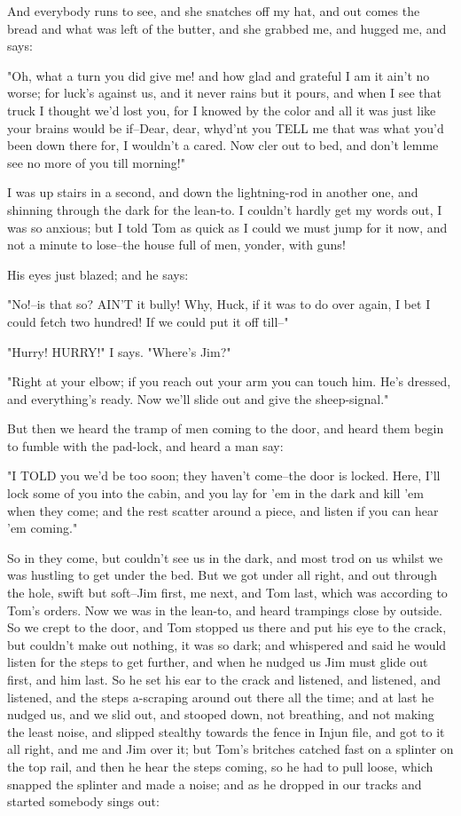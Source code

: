 And everybody runs to see, and she snatches off my hat, and out comes the
bread and what was left of the butter, and she grabbed me, and hugged me,
and says:

"Oh, what a turn you did give me! and how glad and grateful I am it ain't
no worse; for luck's against us, and it never rains but it pours, and
when I see that truck I thought we'd lost you, for I knowed by the color
and all it was just like your brains would be if--Dear, dear, whyd'nt you
TELL me that was what you'd been down there for, I wouldn't a cared.  Now
cler out to bed, and don't lemme see no more of you till morning!"

I was up stairs in a second, and down the lightning-rod in another one,
and shinning through the dark for the lean-to.  I couldn't hardly get my
words out, I was so anxious; but I told Tom as quick as I could we must
jump for it now, and not a minute to lose--the house full of men, yonder,
with guns!

His eyes just blazed; and he says:

"No!--is that so?  AIN'T it bully!  Why, Huck, if it was to do over
again, I bet I could fetch two hundred!  If we could put it off till--"

"Hurry!  HURRY!"  I says.  "Where's Jim?"

"Right at your elbow; if you reach out your arm you can touch him.  He's
dressed, and everything's ready.  Now we'll slide out and give the
sheep-signal."

But then we heard the tramp of men coming to the door, and heard them
begin to fumble with the pad-lock, and heard a man say:

"I TOLD you we'd be too soon; they haven't come--the door is locked.
Here, I'll lock some of you into the cabin, and you lay for 'em in the
dark and kill 'em when they come; and the rest scatter around a piece,
and listen if you can hear 'em coming."

So in they come, but couldn't see us in the dark, and most trod on us
whilst we was hustling to get under the bed.  But we got under all right,
and out through the hole, swift but soft--Jim first, me next, and Tom
last, which was according to Tom's orders.  Now we was in the lean-to,
and heard trampings close by outside.  So we crept to the door, and Tom
stopped us there and put his eye to the crack, but couldn't make out
nothing, it was so dark; and whispered and said he would listen for the
steps to get further, and when he nudged us Jim must glide out first, and
him last.  So he set his ear to the crack and listened, and listened, and
listened, and the steps a-scraping around out there all the time; and at
last he nudged us, and we slid out, and stooped down, not breathing, and
not making the least noise, and slipped stealthy towards the fence in
Injun file, and got to it all right, and me and Jim over it; but Tom's
britches catched fast on a splinter on the top rail, and then he hear the
steps coming, so he had to pull loose, which snapped the splinter and
made a noise; and as he dropped in our tracks and started somebody sings
out:

